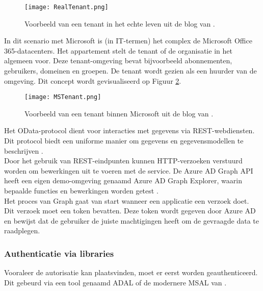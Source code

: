 \begin{figure}[!h]
    \texttt{[image: RealTenant.png]}
    \caption[Voorbeeld werkelijke tenant]{Voorbeeld van een tenant in het echte leven uit de blog van \textcite{Saxton2015}.}
    \label{rlt}
\end{figure}

In dit scenario met Microsoft is (in \ac{IT}-termen) het complex de Microsoft Office 365-datacenters. Het appartement stelt de tenant of de organisatie in het algemeen voor. Deze tenant-omgeving bevat bijvoorbeeld abonnementen, gebruikers, domeinen en groepen. De tenant wordt gezien als een huurder van de omgeving. Dit concept wordt gevisualiseerd op Figuur \ref{mst}. \\

\begin{figure}[!h]
    \texttt{[image: MSTenant.png]}
    \caption[Voorbeeld Microsoft tenant]{Voorbeeld van een tenant binnen Microsoft uit de blog van \textcite{Saxton2015}.}
    \label{mst}
\end{figure}

Het OData-protocol dient voor interacties met gegevens via \ac{REST}-webdiensten. Dit protocol biedt een uniforme manier om gegevens en gegevensmodellen te beschrijven \autocite{OData2023}. \\

Door het gebruik van \ac{REST}-eindpunten kunnen \ac{HTTP}-verzoeken verstuurd worden om bewerkingen uit te voeren met de service. De Azure \ac{AD} Graph \ac{API} heeft een eigen demo-omgeving genaamd Azure \ac{AD} Graph Explorer, waarin bepaalde functies en bewerkingen worden getest \autocite{Microsoft}. \\

Het proces van Graph gaat van start wanneer een applicatie een verzoek doet. Dit verzoek moet een token bevatten. Deze token wordt gegeven door Azure \ac{AD} en bewijst dat de gebruiker de juiste machtigingen heeft om de gevraagde data te raadplegen.



\subsubsection{Authenticatie via libraries}

Vooraleer de autorisatie kan plaatsvinden, moet er eerst worden geauthenticeerd. Dit gebeurd via een tool genaamd \ac{ADAL} of de modernere \ac{MSAL} van \textcite{Microsoft2022d}. \\

